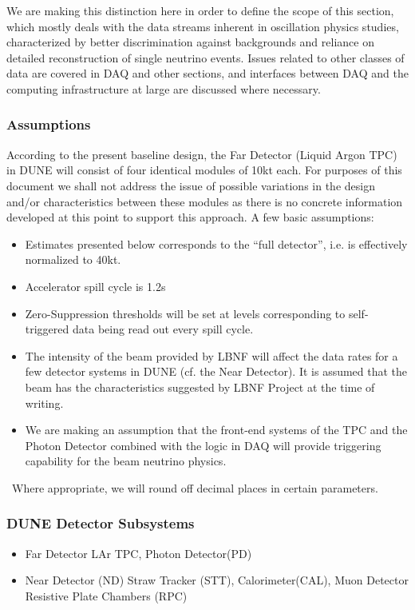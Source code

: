 We are making this distinction here in order to define the scope of this section, which mostly deals with the data streams inherent in
oscillation physics studies, characterized by better discrimination against backgrounds and reliance on detailed reconstruction of single
neutrino events. Issues related to other classes of data are covered in DAQ and other sections, and interfaces between DAQ and the computing
infrastructure at large are discussed where necessary.

\subsubsection{Assumptions}
\label{sec:detectors-sc-infrastructure-assumptions}
According to the present baseline design, the Far Detector (Liquid Argon TPC) in DUNE will consist of four identical modules of 10kt each.
For purposes of this document we shall not address the issue of possible variations in the design and/or characteristics between
these modules as there is no concrete information developed at this point to support this approach. A few basic assumptions:
\begin{itemize}
\item Estimates presented below corresponds to the ``full detector'', i.e. is effectively normalized to 40kt.
\item Accelerator spill cycle is 1.2s
\item Zero-Suppression thresholds will be set at levels corresponding to self-triggered data being read out every spill cycle.
\item The intensity of the beam provided by LBNF will affect the data rates for a few detector systems in DUNE (cf. the Near Detector).
It is assumed that the beam has the characteristics suggested by LBNF Project at the time of writing.
\item We are making an assumption that the front-end systems of the TPC and the Photon Detector combined with the logic in DAQ
will provide triggering capability for the beam neutrino physics.
\end{itemize}
\
Where appropriate, we will round off decimal places in certain parameters.

\subsubsection{DUNE Detector Subsystems}
\begin{itemize}
\item Far Detector LAr TPC, Photon Detector(PD)
\item Near Detector (ND) Straw Tracker (STT), Calorimeter(CAL), Muon Detector Resistive Plate Chambers (RPC)
\end{itemize}

